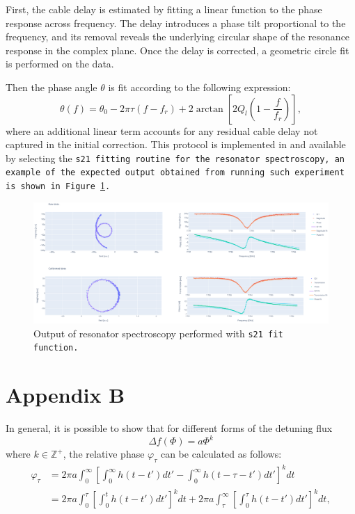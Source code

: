 First, the cable delay is estimated by fitting a linear function to the phase response across frequency. 
The delay introduces a phase tilt proportional to the frequency, and its removal reveals the underlying circular shape of the resonance response in the complex plane. 
Once the delay is corrected, a geometric circle fit is performed on the data.

Then the phase angle $\theta$ is fit according to the following expression:
\begin{equation}
    \theta(f) = \theta_0 - 2\pi \tau (f - f_r) + 2 \arctan \left[ 2 Q_l \left( 1 - \frac{f}{f_r} \right) \right],
\end{equation}
where an additional linear term accounts for any residual cable delay not captured in the initial correction. 
This protocol is implemented in \Qibocal and available by selecting the \tt{s21} fitting routine for the resonator spectroscopy, an example of the expected output obtained from running such experiment is shown in Figure \ref{fig:res_s21}.

\begin{figure}[ht!]
    \centering
    \includegraphics[width=\textwidth]{figures/png/s21.png}
    \caption{Output of resonator spectroscopy performed with \tt{s21} fit function.}
    \label{fig:res_s21}
\end{figure}

\chapter*{Appendix B}
\label{app:AppendixB}

In general, it is possible to show that for different forms of the detuning flux 
\begin{equation}\label{eq:det_flux}
    \Delta f(\Phi) = a\Phi^k
\end{equation}
where $k \in \mathbb{Z}^+$, the relative phase $\varphi_{\tau}$ can be calculated as follows:
\begin{align}
    \varphi_\tau &= 2\pi a \int_{0}^{\infty} \left[ \int_{0}^{\infty} h(t - t') dt' - \int_{0}^{\infty} h(t - \tau - t') dt' \right]^k dt \\
    &= 2\pi a \int_{0}^{\tau} \left[ \int_{0}^{t} h(t - t') dt' \right]^k dt + 2\pi a \int_{\tau}^{\infty} \left[ \int_{0}^{\tau} h(t - t') dt' \right]^k dt,
\end{align}

